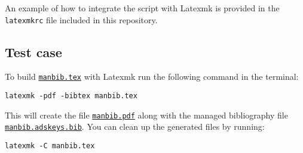 An example of how to integrate the script with Latexmk is provided in
the \texttt{latexmkrc} file included in this repository.

\subsection{Test case}\label{test-case}

To build \href{./manbib.tex}{\texttt{manbib.tex}} with Latexmk run the
following command in the terminal:

\begin{verbatim}
latexmk -pdf -bibtex manbib.tex
\end{verbatim}

This will create the file \href{./manbib.pdf}{\texttt{manbib.pdf}} along
with the managed bibliography file
\href{./manbib.adskeys.bib}{\texttt{manbib.adskeys.bib}}. You can clean
up the generated files by running:

\begin{verbatim}
latexmk -C manbib.tex
\end{verbatim}
